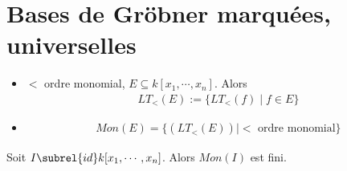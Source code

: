     \section{Bases de Gröbner marquées, universelles}
        \begin{nota}
            \begin{itemize}
                \item $<$ ordre monomial, $E \subseteq k[x_1, \cdots, x_n]$. Alors
                \begin{align*}
                    LT_<(E) := \{LT_<(f) \mid f \in E\}
                \end{align*}
                \item \begin{align*}
                    Mon(E) = \{(LT_<(E)) \mid < \text{ ordre monomial}\}
                \end{align*}
            \end{itemize}
        \end{nota}
        \begin{theo}
            Soit $I \subrel{id} k[x_1, \cdots, x_n]$. Alors $Mon(I)$ est fini.
        \end{theo}
